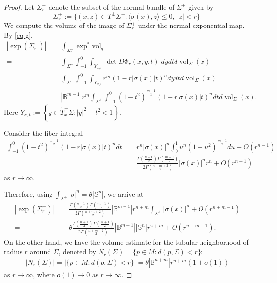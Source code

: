 \documentclass[11pt, reqno]{amsart}
\numberwithin{equation}{section}
\begin{document}
\begin{proof}
Let $\Sigma_r^+$ denote the subset of the normal bundle of $\Sigma^+$ given by
$$\Sigma_r^+:= \{(x, z) \in T^\perp \Sigma^+: \langle \sigma(x), z \rangle \le 0, \; |z| < r\}. $$
We compute the volume of the image of $\Sigma_r^+$ under the normal exponential map. By \eqref{eq g},
\begin{align*}
|\exp(\Sigma^+_r)|
=& \int_{\Sigma_r^+}\exp^* \mathrm{vol}_g\\
=& \int_{\Sigma^+}\int_{-1}^0 \int_{Y_{x, t}}\left|\det D \Phi_r(x, y, t)\right| d y d t d \operatorname{vol}_{\Sigma}(x)\\
=& \int_{\Sigma^{+}} \int_{-1}^0 \int_{Y_{x, t}} r^m(1-r|\sigma(x)| t)^n d y d t d \operatorname{vol}_{\Sigma}(x) \\
=& \left|\mathbb{B}^{m-1}\right| r^m \int_{\Sigma^{+}} \int_{-1}^0\left(1-t^2\right)^{\frac{m-1}{2}}(1-r|\sigma(x)| t)^n d t d \operatorname{vol}_{\Sigma}(x).
\end{align*}
Here $Y_{x, t}:=\left\{y \in \widetilde{T}_x^{\perp} \Sigma:|y|^2+t^2<1\right\}$.

Consider the fiber integral
\begin{equation*}
\begin{aligned}
\int_{-1}^0\left(1-t^2\right)^{\frac{m-1}{2}}(1-r|\sigma(x)| t)^n d t & =r^n|\sigma(x)|^n \int_0^1 u^n\left(1-u^2\right)^{\frac{m-1}{2}} d u+O\left(r^{n-1}\right) \\
& =\frac{\Gamma\left(\frac{n+1}{2}\right) \Gamma\left(\frac{m+1}{2}\right)}{2 \Gamma\left(\frac{n+m+2}{2}\right)}|\sigma(x)|^n r^n+O\left(r^{n-1}\right)
\end{aligned}
\end{equation*}
as $r\to \infty$.

Therefore, using $\int_{\Sigma^+}|\sigma|^n=\theta|\mathbb S^n|$, we arrive at
\begin{align*}
|\exp(\Sigma^+_r)|
=& \frac{\Gamma\left(\frac{n+1}{2}\right) \Gamma\left(\frac{m+1}{2}\right)}{2 \Gamma\left(\frac{n+m+2}{2}\right)}|\mathbb B^{m-1}|r^{n+m}\int_{\Sigma^+} |\sigma(x)|^n +O(r^{n+m-1})\\
=& \theta \frac{\Gamma\left(\frac{n+1}{2}\right) \Gamma\left(\frac{m+1}{2}\right)}{2 \Gamma\left(\frac{n+m+2}{2}\right)}|\mathbb B^{m-1}| |\mathbb S^n|r^{n+m}+O(r^{n+m-1}).
\end{align*}
On the other hand, we have the volume estimate for the tubular neighborhood of radius $r$ around $\Sigma$, denoted by $N_r(\Sigma) =
\{p \in M: d(p, \Sigma) < r \}$:
\begin{align*}
|N_r(\Sigma)|=|\{p \in M: d(p, \Sigma)< r \}| = \theta |\mathbb B^{n+m}|r^{n+m}(1+o(1))
\end{align*}
as $r\to \infty$, where $o(1)\to 0$ as $r\to \infty$.


\end{proof}
\end{document}
